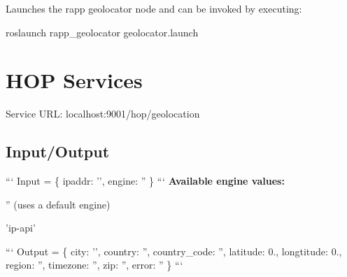 Launches the rapp geolocator node and can be invoked by executing\-:

{\ttfamily roslaunch rapp\-\_\-geolocator geolocator.\-launch}

\section*{H\-O\-P Services}

Service U\-R\-L\-: {\ttfamily localhost\-:9001/hop/geolocation}

\subsection*{Input/\-Output}

``` Input = \{ ipaddr\-: '', engine\-: '' \} ``` {\bfseries Available engine values\-:}
\begin{DoxyItemize}
\item '' (uses a default engine)
\item 'ip-\/api'
\end{DoxyItemize}

``` Output = \{ city\-: '', country\-: '', country\-\_\-code\-: '', latitude\-: 0., longtitude\-: 0., region\-: '', timezone\-: '', zip\-: '', error\-: '' \} ``` 